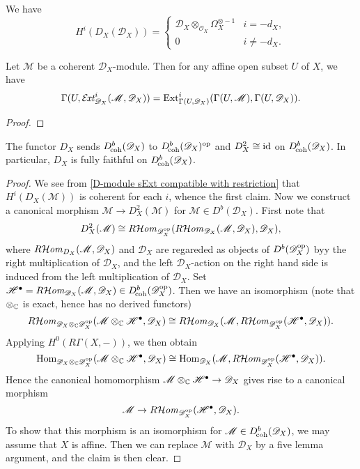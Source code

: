 \begin{example}
We have 
\[H^i(D_X(\mathscr{D}_X))=\begin{cases}
\mathscr{D}_X\otimes_{\mathscr{O}_X}\Omega_X^{\otimes-1}&i=-d_X,\\
0&i\neq -d_X.
\end{cases}\]
\end{example}

\begin{lemma}\label{D-module sExt compatible with restriction}
Let $\mathscr{M}$ be a coherent $\mathscr{D}_X$-module. Then for any affine open subset $U$ of $X$, we have
\[\Gamma(U,\operatorname{\mathcal{E}\hspace*{-1.3pt}\textit{xt}\hspace{0.5pt}}_{\mathscr{D}_X}^i(\mathscr{M},\mathscr{D}_X))=\mathrm{Ext}_{\Gamma(U,\mathscr{D}_X)}^i(\Gamma(U,\mathscr{M}),\Gamma(U,\mathscr{D}_X)).\]
\end{lemma}
\begin{proof}

\end{proof}

\begin{proposition}\label{D-module dual functor involutive prop}
The functor $D_X$ sends $D_{\!\mathrm{coh}}^b(\mathscr{D}_X)$ to $D^b_{\!\mathrm{coh}}(\mathscr{D}_X)^{\mathrm{op}}$ and $D_X^2\cong\operatorname{id}$ on $D_{\!\mathrm{coh}}^b(\mathscr{D}_X)$. In particular, $D_X$ is fully faithful on $D_{\!\mathrm{coh}}^b(\mathscr{D}_X)$.
\end{proposition}
\begin{proof}
We see from \cref{D-module sExt compatible with restriction} that $H^i(D_X(\mathscr{M}))$ is coherent for each $i$, whence the first claim. Now we construct a canonical morphism $\mathscr{M}\to D_X^2(\mathscr{M})$ for $\mathscr{M}\in D^b(\mathscr{D}_X)$. First note that
\[D_X^2(\mathscr{M})\cong R\!\operatorname{\mathcal{H}\hspace*{-0.4pt}\textit{om}\hspace{0.5pt}}_{\mathscr{D}_X^{\mathrm{op}}}(R\!\operatorname{\mathcal{H}\hspace*{-0.4pt}\textit{om}\hspace{0.5pt}}_{\mathscr{D}_X}(\mathscr{M},\mathscr{D}_X),\mathscr{D}_X),\]
where $R\!\operatorname{\mathcal{H}\hspace*{-0.4pt}\textit{om}\hspace{0.5pt}}_{D_X}(\mathscr{M},\mathscr{D}_X)$ and $\mathscr{D}_X$ are regareded as objects of $D^b(\mathscr{D}_X^{\mathrm{op}})$ byy the right multiplication of $\mathscr{D}_X$, and the left $\mathscr{D}_X$-action on the right hand side is induced from the left multiplication of $\mathscr{D}_X$. Set $\mathscr{H}^\bullet=R\!\operatorname{\mathcal{H}\hspace*{-0.4pt}\textit{om}\hspace{0.5pt}}_{\mathscr{D}_X}(\mathscr{M},\mathscr{D}_X)\in D^b_{\!\mathrm{coh}}(\mathscr{D}_X^{\mathrm{op}})$. Then we have an isomorphism (note that $\otimes_{\mathbb{C}}$ is exact, hence has no derived functors)
\[R\!\operatorname{\mathcal{H}\hspace*{-0.4pt}\textit{om}\hspace{0.5pt}}_{\mathscr{D}_X\otimes_{\mathbb{C}}\mathscr{D}_X^{\mathrm{op}}}(\mathscr{M}\otimes_{\mathbb{C}}\mathscr{H}^\bullet,\mathscr{D}_X)\cong R\!\operatorname{\mathcal{H}\hspace*{-0.4pt}\textit{om}\hspace{0.5pt}}_{\mathscr{D}_X}(\mathscr{M},R\!\operatorname{\mathcal{H}\hspace*{-0.4pt}\textit{om}\hspace{0.5pt}}_{\mathscr{D}_X^{\mathrm{op}}}(\mathscr{H}^\bullet,\mathscr{D}_X)).\]
Applying $H^0(R\Gamma(X,-))$, we then obtain
\[\mathrm{Hom}_{\mathscr{D}_X\otimes_{\mathbb{C}}\mathscr{D}_X^{\mathrm{op}}}(\mathscr{M}\otimes_{\mathbb{C}}\mathscr{H}^\bullet,\mathscr{D}_X)\cong \mathrm{Hom}_{\mathscr{D}_X}(\mathscr{M},R\!\operatorname{\mathcal{H}\hspace*{-0.4pt}\textit{om}\hspace{0.5pt}}_{\mathscr{D}_X^{\mathrm{op}}}(\mathscr{H}^\bullet,\mathscr{D}_X)).\]
Hence the canonical homomorphism $\mathscr{M}\otimes_{\mathbb{C}}\mathscr{H}^\bullet\to\mathscr{D}_X$ gives rise to a canonical morphism
\[\mathscr{M}\to R\!\operatorname{\mathcal{H}\hspace*{-0.4pt}\textit{om}\hspace{0.5pt}}_{\mathscr{D}_X^{\mathrm{op}}}(\mathscr{H}^\bullet,\mathscr{D}_X).\]
To show that this morphism is an isomorphism for $\mathscr{M}\in D_{\!\mathrm{coh}}^b(\mathscr{D}_X)$, we may assume that $X$ is affine. Then we can replace $\mathscr{M}$ with $\mathscr{D}_X$ by a five lemma argument, and the claim is then clear.
\end{proof}

